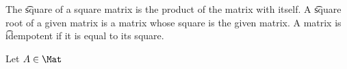 



The \t{square} of a square matrix is the product of the matrix with itself.
A \t{square root} of a given matrix is a matrix whose square is the given matrix.
A matrix is \t{idempotent} if it is equal to its square.


Let $A \in \Mat$
